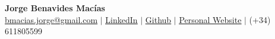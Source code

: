 \begin{center}
  \textbf{\Huge Jorge Benavides Macías} \\ \vspace{1pt}
  \href{mailto:bmacias.jorge@gmail.com}{\underline{bmacias.jorge@gmail.com}} $|$
  \href{https://www.linkedin.com/in/jorgebenavidesm/}{\underline{LinkedIn}} $|$
  \href{https://www.github.com/rhyloo}{\underline{Github}} $|$
  \href{https://www.rhyloo.com}{\underline{Personal Website}} $|$
  (+34) 611805599 \\
\end{center}
